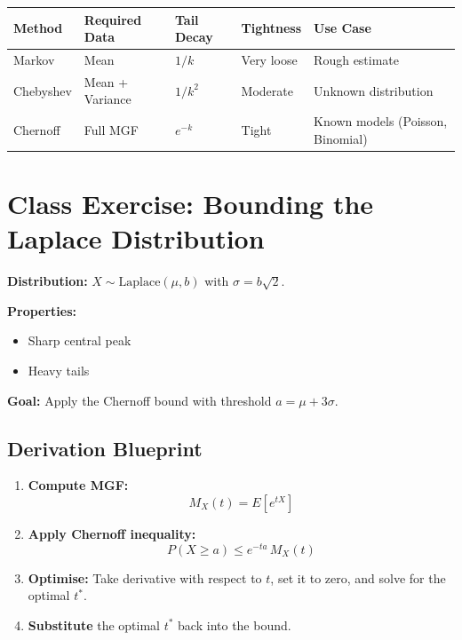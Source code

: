 \documentclass[12pt, a4paper]{article}
\newcommand{\EX}[1]{E\!\left[#1\right]}
\begin{document}
\begin{center}
\begin{tabular}{p{2.2cm} p{2.8cm} p{2cm} p{2.2cm} p{3.5cm}}
  \toprule
  \textbf{Method} & \textbf{Required Data} & \textbf{Tail Decay}
    & \textbf{Tightness} & \textbf{Use Case} \\
  \midrule
  Markov      & Mean                    & $1/k$     & Very loose & Rough estimate \\[4pt]
  Chebyshev   & Mean + Variance         & $1/k^2$   & Moderate   & Unknown distribution \\[4pt]
  Chernoff    & Full MGF                & $e^{-k}$  & Tight      & Known models (Poisson, Binomial) \\
  \bottomrule
\end{tabular}
\end{center}

\section{Class Exercise: Bounding the Laplace Distribution}

\textbf{Distribution:} $X \sim \mathrm{Laplace}(\mu, b)$ with $\sigma = b\sqrt{2}$.

\textbf{Properties:}
\begin{itemize}[leftmargin=2em]
  \item Sharp central peak
  \item Heavy tails
\end{itemize}

\textbf{Goal:} Apply the Chernoff bound with threshold $a = \mu + 3\sigma$.

\subsection*{Derivation Blueprint}

\begin{enumerate}[leftmargin=2em, label=\textbf{Step \arabic*.}]
  \item \textbf{Compute MGF:}
    \[
      M_X(t) = \EX{e^{tX}}
    \]
  \item \textbf{Apply Chernoff inequality:}
    \[
      P(X \geq a) \leq e^{-ta}\,M_X(t)
    \]
  \item \textbf{Optimise:} Take derivative with respect to $t$, set it to zero, and solve
        for the optimal $t^*$.
  \item \textbf{Substitute} the optimal $t^*$ back into the bound.
\end{enumerate}
\end{document}

